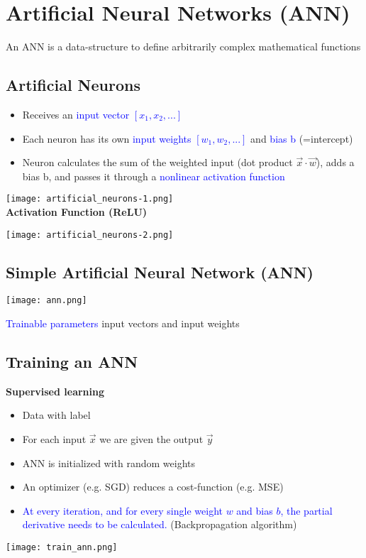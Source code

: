 
\section{Artificial Neural Networks (ANN)}
An ANN is a data-structure to define arbitrarily complex mathematical functions

\subsection{Artificial Neurons}
\begin{itemize}
    \item Receives an \textcolor{blue}{input vector $[x_1,x_2, ...]$}
    \item Each neuron has its own \textcolor{blue}{input weights $[w_1, w_2, ...]$} and \textcolor{blue}{bias b} (=intercept)
    \item Neuron calculates the sum of the weighted input (dot product $\vec{x} \cdot \vec{w}$), adds a bias b, and passes it through a \textcolor{blue}{nonlinear activation function}
\end{itemize}
\texttt{[image: artificial\_neurons-1.png]} \\

\textbf{Activation Function (ReLU)}

\texttt{[image: artificial\_neurons-2.png]}


\subsection{Simple Artificial Neural Network (ANN)}
\texttt{[image: ann.png]}

\textcolor{blue}{Trainable parameters} input vectors and input weights

\subsection{Training an ANN}
\textbf{Supervised learning}
\begin{itemize}
    \item Data with label
    \item For each input $\vec{x}$ we are given the output $\vec{y}$
    \item ANN is initialized with random weights
    \item An optimizer (e.g. SGD) reduces a cost-function (e.g. MSE)
    \item \textcolor{blue}{At every iteration, and for every single weight $w$ and bias $b$, the partial derivative needs to be calculated.} (Backpropagation algorithm)
\end{itemize}
\texttt{[image: train\_ann.png]}
